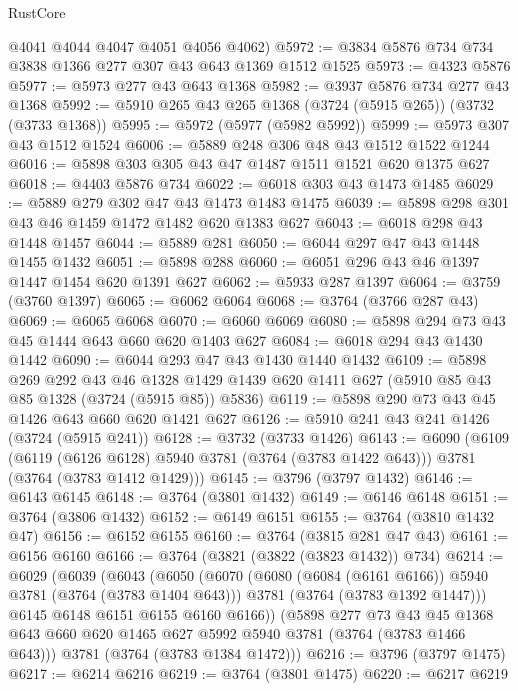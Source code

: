 \begin{lexlean}{RustCore}
\begin{coremodule}
      @4041
      @4044
      @4047
      @4051
      @4056
      @4062)
@5972 := @3834 @5876 @734 @734 @3838 @1366 @277 @307 @43 @643 @1369 @1512 @1525
@5973 := @4323 @5876
@5977 := @5973 @277 @43 @643 @1368
@5982 := @3937 @5876 @734 @277 @43 @1368
@5992 := @5910 @265 @43 @265 @1368 (@3724 (@5915 @265)) (@3732 (@3733 @1368))
@5995 := @5972 (@5977 (@5982 @5992))
@5999 := @5973 @307 @43 @1512 @1524
@6006 := @5889 @248 @306 @48 @43 @1512 @1522 @1244
@6016 := @5898 @303 @305 @43 @47 @1487 @1511 @1521 @620 @1375 @627
@6018 := @4403 @5876 @734
@6022 := @6018 @303 @43 @1473 @1485
@6029 := @5889 @279 @302 @47 @43 @1473 @1483 @1475
@6039 := @5898 @298 @301 @43 @46 @1459 @1472 @1482 @620 @1383 @627
@6043 := @6018 @298 @43 @1448 @1457
@6044 := @5889 @281
@6050 := @6044 @297 @47 @43 @1448 @1455 @1432
@6051 := @5898 @288
@6060 := @6051 @296 @43 @46 @1397 @1447 @1454 @620 @1391 @627
@6062 := @5933 @287 @1397
@6064 := @3759 (@3760 @1397)
@6065 := @6062 @6064
@6068 := @3764 (@3766 @287 @43)
@6069 := @6065 @6068
@6070 := @6060 @6069
@6080 := @5898 @294 @73 @43 @45 @1444 @643 @660 @620 @1403 @627
@6084 := @6018 @294 @43 @1430 @1442
@6090 := @6044 @293 @47 @43 @1430 @1440 @1432
@6109 := @5898
    @269
    @292
    @43
    @46
    @1328
    @1429
    @1439
    @620
    @1411
    @627
    (@5910 @85 @43 @85 @1328 (@3724 (@5915 @85)) @5836)
@6119 := @5898 @290 @73 @43 @45 @1426 @643 @660 @620 @1421 @627
@6126 := @5910 @241 @43 @241 @1426 (@3724 (@5915 @241))
@6128 := @3732 (@3733 @1426)
@6143 := @6090
    (@6109
      (@6119 (@6126 @6128) @5940 @3781 (@3764 (@3783 @1422 @643)))
      @3781
      (@3764 (@3783 @1412 @1429)))
@6145 := @3796 (@3797 @1432)
@6146 := @6143 @6145
@6148 := @3764 (@3801 @1432)
@6149 := @6146 @6148
@6151 := @3764 (@3806 @1432)
@6152 := @6149 @6151
@6155 := @3764 (@3810 @1432 @47)
@6156 := @6152 @6155
@6160 := @3764 (@3815 @281 @47 @43)
@6161 := @6156 @6160
@6166 := @3764 (@3821 (@3822 (@3823 @1432)) @734)
@6214 := @6029
    (@6039
      (@6043
        (@6050
          (@6070
            (@6080 (@6084 (@6161 @6166)) @5940 @3781 (@3764 (@3783 @1404 @643)))
            @3781
            (@3764 (@3783 @1392 @1447)))
          @6145
          @6148
          @6151
          @6155
          @6160
          @6166))
      (@5898
        @277
        @73
        @43
        @45
        @1368
        @643
        @660
        @620
        @1465
        @627
        @5992
        @5940
        @3781
        (@3764 (@3783 @1466 @643)))
      @3781
      (@3764 (@3783 @1384 @1472)))
@6216 := @3796 (@3797 @1475)
@6217 := @6214 @6216
@6219 := @3764 (@3801 @1475)
@6220 := @6217 @6219

\end{coremodule}
\end{lexlean}

